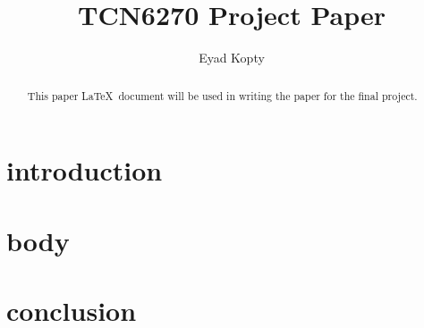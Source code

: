\documentclass[10pt,sigconf]{acmart}
\begin{document}
\title{TCN6270 Project Paper}


\author{Eyad Kopty}
\orcid{}



\begin{abstract}
This paper \LaTeX\ document will be used in writing the paper for the final project.
\end{abstract}

\maketitle

\section{introduction}


\section{body}
 \cite{opasiak2018secure}

\section{conclusion}




 
\end{document}
